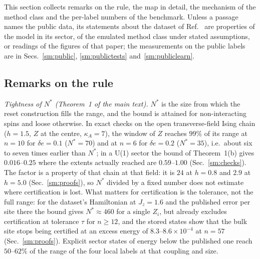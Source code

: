 \documentclass[aps,prx,onecolumn,10pt,nofootinbib,longbibliography,floatfix]{revtex4-2}
\theoremstyle{remark}
\newcommand{\Jz}{J_z}
\newcommand{\de}{\delta e}
\begin{document}
This section collects remarks on the rule, the map in detail, the mechanism of the method class and the per-label
numbers of the benchmark. Unless a passage names the public data, its statements about the dataset of
Ref.~\cite{jaderberg2026} are properties of the model in its sector, of the emulated method class under stated
assumptions, or readings of the figures of that paper; the measurements on the public labels are in
Secs.~\ref{sm:public}, \ref{sm:publictests} and~\ref{sm:publiclearn}.

\subsection{Remarks on the rule}

\emph{Tightness of $N^*$ (Theorem~1 of the main text).} $N^*$ is the size from which the reset construction fills %
the range, and the bound is attained for non-interacting spins and loose otherwise. In exact checks on the open
transverse-field Ising chain ($h=1.5$, $Z$ at the centre, $\kappa_A=7$), the window of $Z$ reaches $99\%$ of its range %
at $n=10$ for $\de=0.1$ ($N^*=70$) and at $n=6$ for $\de=0.2$ ($N^*=35$), i.e.\ about six to seven times earlier %
than $N^*$; in a U(1) sector the bound of Theorem~1(b) gives $0.016$--$0.25$ where the extents actually reached are %
$0.59$--$1.00$ (Sec.~\ref{sm:checks}). The factor is a property of that chain at that field: it is $24$ at $h=0.8$ %
and $2.9$ at $h=5.0$ (Sec.~\ref{sm:proofs}), so $N^*$ divided by a fixed number does not estimate where certification is lost. %
What matters for certification is the tolerance, not the full range: for the dataset's Hamiltonian at $\Jz=1.6$
and the published error per site there the bound gives $N^*\approx460$ for a single $Z_i$, but already excludes %
certification at tolerance $\tau$ for $n\ge12$, and the stored states show that the bulk site stops being certified %
at an excess energy of $8.3$--$8.6\times10^{-4}$ at $n=57$ (Sec.~\ref{sm:proofs}). Explicit sector states of energy %
below the published one reach $50$--$62\%$ of the range of the four local labels at that coupling and size. %
\end{document}
